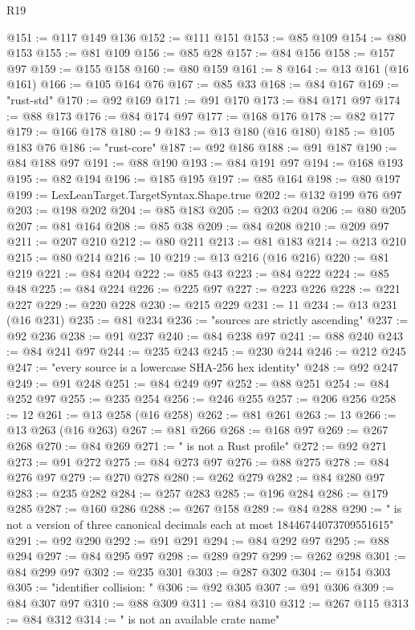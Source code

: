 \begin{lexlean}{R19}
\begin{coremodule}
{{{{{{{{{{{{{{{{{{{{{{{{{{{{{{{{{{{{{{{{{{{{{{{{{{{{{{{{{{{{{{{{{{{{{{{{{{{{{{{{{{{{{{{@151 := @117 @149 @136
@152 := @111 @151
@153 := @85 @109
@154 := @80 @153
@155 := @81 @109
@156 := @85 @28
@157 := @84 @156
@158 := @157 @97
@159 := @155 @158
@160 := @80 @159
@161 := 8
@164 := @13 @161 (@16 @161)
@166 := @105 @164 @76
@167 := @85 @33
@168 := @84 @167
@169 := "rust-std"
@170 := @92 @169
@171 := @91 @170
@173 := @84 @171 @97
@174 := @88 @173
@176 := @84 @174 @97
@177 := @168 @176
@178 := @82 @177
@179 := @166 @178
@180 := 9
@183 := @13 @180 (@16 @180)
@185 := @105 @183 @76
@186 := "rust-core"
@187 := @92 @186
@188 := @91 @187
@190 := @84 @188 @97
@191 := @88 @190
@193 := @84 @191 @97
@194 := @168 @193
@195 := @82 @194
@196 := @185 @195
@197 := @85 @164
@198 := @80 @197
@199 := LexLeanTarget.TargetSyntax.Shape.true
@202 := @132 @199 @76 @97
@203 := @198 @202
@204 := @85 @183
@205 := @203 @204
@206 := @80 @205
@207 := @81 @164
@208 := @85 @38
@209 := @84 @208
@210 := @209 @97
@211 := @207 @210
@212 := @80 @211
@213 := @81 @183
@214 := @213 @210
@215 := @80 @214
@216 := 10
@219 := @13 @216 (@16 @216)
@220 := @81 @219
@221 := @84 @204
@222 := @85 @43
@223 := @84 @222
@224 := @85 @48
@225 := @84 @224
@226 := @225 @97
@227 := @223 @226
@228 := @221 @227
@229 := @220 @228
@230 := @215 @229
@231 := 11
@234 := @13 @231 (@16 @231)
@235 := @81 @234
@236 := "sources are strictly ascending"
@237 := @92 @236
@238 := @91 @237
@240 := @84 @238 @97
@241 := @88 @240
@243 := @84 @241 @97
@244 := @235 @243
@245 := @230 @244
@246 := @212 @245
@247 := "every source is a lowercase SHA-256 hex identity"
@248 := @92 @247
@249 := @91 @248
@251 := @84 @249 @97
@252 := @88 @251
@254 := @84 @252 @97
@255 := @235 @254
@256 := @246 @255
@257 := @206 @256
@258 := 12
@261 := @13 @258 (@16 @258)
@262 := @81 @261
@263 := 13
@266 := @13 @263 (@16 @263)
@267 := @81 @266
@268 := @168 @97
@269 := @267 @268
@270 := @84 @269
@271 := " is not a Rust profile"
@272 := @92 @271
@273 := @91 @272
@275 := @84 @273 @97
@276 := @88 @275
@278 := @84 @276 @97
@279 := @270 @278
@280 := @262 @279
@282 := @84 @280 @97
@283 := @235 @282
@284 := @257 @283
@285 := @196 @284
@286 := @179 @285
@287 := @160 @286
@288 := @267 @158
@289 := @84 @288
@290 := " is not a version of three canonical decimals each at most 18446744073709551615"
@291 := @92 @290
@292 := @91 @291
@294 := @84 @292 @97
@295 := @88 @294
@297 := @84 @295 @97
@298 := @289 @297
@299 := @262 @298
@301 := @84 @299 @97
@302 := @235 @301
@303 := @287 @302
@304 := @154 @303
@305 := "identifier collision: "
@306 := @92 @305
@307 := @91 @306
@309 := @84 @307 @97
@310 := @88 @309
@311 := @84 @310
@312 := @267 @115
@313 := @84 @312
@314 := " is not an available crate name"
}}}}}}}}}}}}}}}}}}}}}}}}}}}}}}}}}}}}}}}}}}}}}}}}}}}}}}}}}}}}}}}}}}}}}}}}}}}}}}}}}}}}}}}
\end{coremodule}
\end{lexlean}
